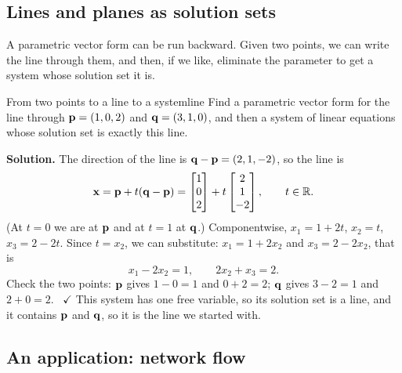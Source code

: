 \documentclass[11pt]{article}
\begin{document}
\subsection*{Lines and planes as solution sets}

A parametric vector form can be run backward. Given two points, we can write the line through them, and then, if we like, eliminate the parameter to get a system whose solution set it is.

\begin{exmp}{From two points to a line to a system}{line}
Find a parametric vector form for the line through $\mathbf{p}=(1,0,2)$ and $\mathbf{q}=(3,1,0)$, and then a system of linear equations whose solution set is exactly this line.

\textbf{Solution.} The direction of the line is $\mathbf{q}-\mathbf{p}=(2,1,-2)$, so the line is
\[
\mathbf{x}=\mathbf{p}+t(\mathbf{q}-\mathbf{p})=\begin{bmatrix}1\\0\\2\end{bmatrix}+t\begin{bmatrix}2\\1\\-2\end{bmatrix},\qquad t\in\mathbb{R}.
\]
(At $t=0$ we are at $\mathbf{p}$ and at $t=1$ at $\mathbf{q}$.) Componentwise, $x_1=1+2t$, $x_2=t$, $x_3=2-2t$. Since $t=x_2$, we can substitute: $x_1=1+2x_2$ and $x_3=2-2x_2$, that is
\[
x_1-2x_2=1,\qquad 2x_2+x_3=2.
\]
Check the two points: $\mathbf{p}$ gives $1-0=1$ and $0+2=2$; $\mathbf{q}$ gives $3-2=1$ and $2+0=2$. \ $\checkmark$ This system has one free variable, so its solution set is a line, and it contains $\mathbf{p}$ and $\mathbf{q}$, so it is the line we started with.
\end{exmp}

\subsection*{An application: network flow}
\end{document}

